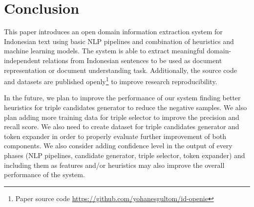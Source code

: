 \documentclass[conference,compsoc,12pt]{IEEEtran}
\begin{document}
\section{Conclusion}

This paper introduces an open domain information extraction system for Indonesian text using basic NLP pipelines and combination of heuristics and machine learning models. The system is able to extract meaningful domain-independent relations from Indonesian sentences to be used as document representation or document understanding task. Additionally, the source code and datasets are published openly\footnote{Paper source code \url{https://github.com/yohanesgultom/id-openie}} to improve research reproducibility.

In the future, we plan to improve the performance of our system finding better heuristics for triple candidates generator to reduce the negative samples. We also plan adding more training data for triple selector to improve the precision and recall score. We also need to create dataset for triple candidates generator and token expander in order to properly evaluate further improvement of both components. We also consider adding confidence level in the output of every phases (NLP pipelines, candidate generator, triple selector, token expander) and including them as features and/or heuristics may also improve the overall performance of the system.






\end{document}
